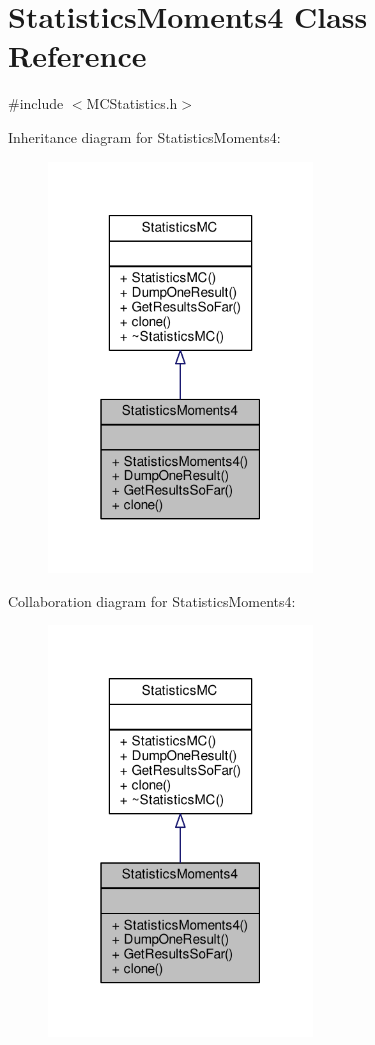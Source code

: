 \hypertarget{classStatisticsMoments4}{}\section{Statistics\+Moments4 Class Reference}
\label{classStatisticsMoments4}


{\ttfamily \#include $<$M\+C\+Statistics.\+h$>$}



Inheritance diagram for Statistics\+Moments4\+:
\nopagebreak
\begin{figure}[H]
\begin{center}
\leavevmode
\includegraphics[width=199pt]{classStatisticsMoments4__inherit__graph}
\end{center}
\end{figure}


Collaboration diagram for Statistics\+Moments4\+:
\nopagebreak
\begin{figure}[H]
\begin{center}
\leavevmode
\includegraphics[width=199pt]{classStatisticsMoments4__coll__graph}
\end{center}
\end{figure}
